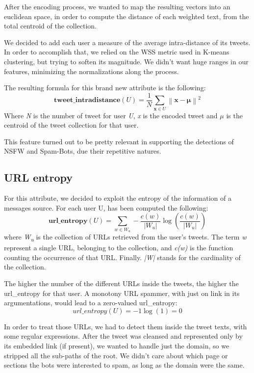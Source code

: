 After the encoding process, we wanted to map the resulting vectors into an euclidean space, in order to compute the distance of each weighted text, from the total centroid of the collection.

We decided to add each user a measure of the average intra-distance of its tweets.\\
In order to accomplish that, we relied on the WSS metric used in K-means clustering, but trying to soften its magnitude. We didn't want huge ranges in our features, minimizing the normalizations along the process.

The resulting formula for this brand new attribute is the following:
\[\textbf{tweet\_intradistance}(U) = \frac{1}{N}\sum _{\mathbf {x} \in U}\left\|\mathbf {x} -{\boldsymbol {\mu }}\right\|^{2}\]
Where \textit{N} is the number of tweet for user \textit{U}, \textit{x} is the encoded tweet and $\mu$ is the centroid of the tweet collection for that user.

This feature turned out to be pretty relevant in supporting the detections of NSFW and Spam-Bots, due their repetitive natures.

\subsection{URL entropy}

For this attribute, we decided to exploit the entropy of the information of a messages source. 
For each user U, has been computed the following:
\[\textbf{url\_entropy}(U) = \sum _{w \in W_{u}}-\frac{c(w)}{|W_{u}|}\log( \frac{c(w)}{|W_{u}|})\]
where \textit{W\textsubscript{u}} is the collection of URLs retrieved from the user's tweets. The term \textit{w} represent a single URL, belonging to the collection, and  
\textit{c(w)} is the function counting the occurrence of that URL. Finally. \textit{|W|} stands for the cardinality of the collection.

The higher the number of the different URLs inside the tweets, the higher the url\_entropy for that user.
A monotony URL spammer, with just on link in its argumentations, would lead to a zero-valued url\_entropy:
\[url\_entropy(U) = -1\log(1) = 0\]

In order to treat those URLs, we had to detect them inside the tweet texts, with some regular expressions. After the tweet was cleansed and represented only by its embedded link (if present), we wanted to handle just the domain, so we stripped all the sub-paths of the root.
We didn't care about which page or sections the bots were interested to spam, as long as the domain were the same.

